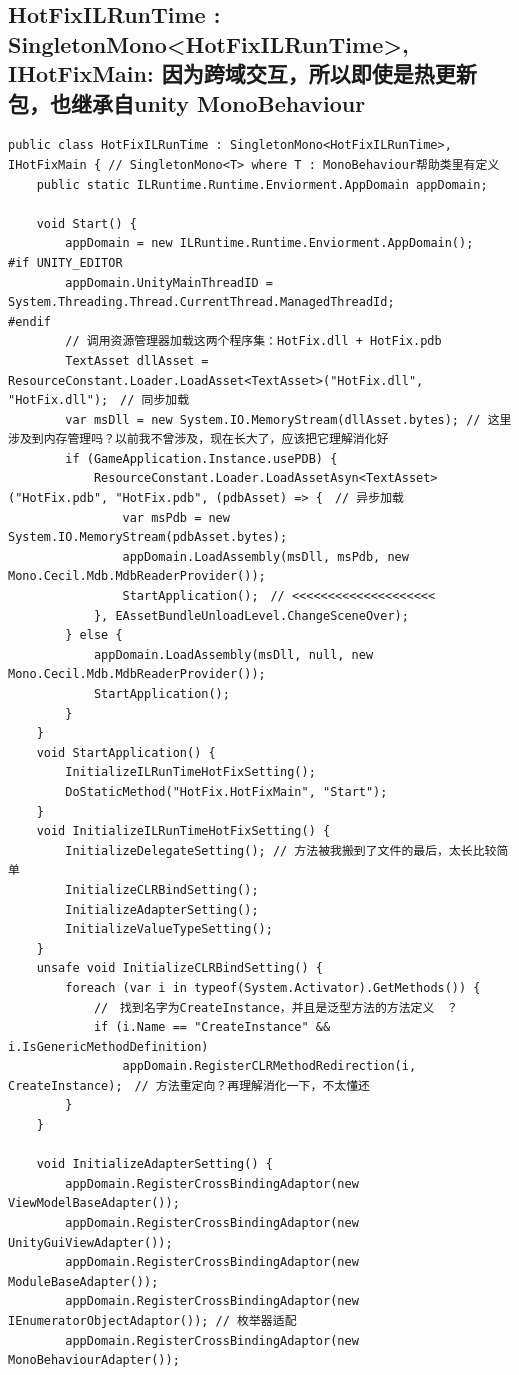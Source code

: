 \documentclass[9pt, b5paper]{article}
\begin{document}
\subsection{HotFixILRunTime : SingletonMono<HotFixILRunTime>, IHotFixMain: 因为跨域交互，所以即使是热更新包，也继承自unity MonoBehaviour}
\label{sec-5-6}
\begin{verbatim}
public class HotFixILRunTime : SingletonMono<HotFixILRunTime>, IHotFixMain { // SingletonMono<T> where T : MonoBehaviour帮助类里有定义
    public static ILRuntime.Runtime.Enviorment.AppDomain appDomain;

    void Start() {
        appDomain = new ILRuntime.Runtime.Enviorment.AppDomain();
#if UNITY_EDITOR
        appDomain.UnityMainThreadID = System.Threading.Thread.CurrentThread.ManagedThreadId;
#endif
        // 调用资源管理器加载这两个程序集：HotFix.dll + HotFix.pdb
        TextAsset dllAsset = ResourceConstant.Loader.LoadAsset<TextAsset>("HotFix.dll", "HotFix.dll");　// 同步加载
        var msDll = new System.IO.MemoryStream(dllAsset.bytes); // 这里涉及到内存管理吗？以前我不曾涉及，现在长大了，应该把它理解消化好
        if (GameApplication.Instance.usePDB) {
            ResourceConstant.Loader.LoadAssetAsyn<TextAsset>("HotFix.pdb", "HotFix.pdb", (pdbAsset) => {　// 异步加载
                var msPdb = new System.IO.MemoryStream(pdbAsset.bytes);
                appDomain.LoadAssembly(msDll, msPdb, new Mono.Cecil.Mdb.MdbReaderProvider());
                StartApplication();　// <<<<<<<<<<<<<<<<<<<< 
            }, EAssetBundleUnloadLevel.ChangeSceneOver);
        } else {
            appDomain.LoadAssembly(msDll, null, new Mono.Cecil.Mdb.MdbReaderProvider());
            StartApplication();
        }
    }
    void StartApplication() {
        InitializeILRunTimeHotFixSetting();
        DoStaticMethod("HotFix.HotFixMain", "Start");
    }
    void InitializeILRunTimeHotFixSetting() {
        InitializeDelegateSetting(); // 方法被我搬到了文件的最后，太长比较简单
        InitializeCLRBindSetting();
        InitializeAdapterSetting();
        InitializeValueTypeSetting();
    }
    unsafe void InitializeCLRBindSetting() {
        foreach (var i in typeof(System.Activator).GetMethods()) {
            //　找到名字为CreateInstance，并且是泛型方法的方法定义　？
            if (i.Name == "CreateInstance" && i.IsGenericMethodDefinition) 
                appDomain.RegisterCLRMethodRedirection(i, CreateInstance);　// 方法重定向？再理解消化一下，不太懂还
        }
    }

    void InitializeAdapterSetting() {
        appDomain.RegisterCrossBindingAdaptor(new ViewModelBaseAdapter());  
        appDomain.RegisterCrossBindingAdaptor(new UnityGuiViewAdapter());   
        appDomain.RegisterCrossBindingAdaptor(new ModuleBaseAdapter());     
        appDomain.RegisterCrossBindingAdaptor(new IEnumeratorObjectAdaptor()); // 枚举器适配
        appDomain.RegisterCrossBindingAdaptor(new MonoBehaviourAdapter()); 


\end{verbatim}
\end{document}

